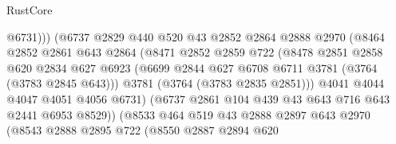 \begin{lexlean}{RustCore}
\begin{coremodule}
                                      @6731)))
                                (@6737
                                  @2829
                                  @440
                                  @520
                                  @43
                                  @2852
                                  @2864
                                  @2888
                                  @2970
                                  (@8464
                                    @2852
                                    @2861
                                    @643
                                    @2864
                                    (@8471
                                      @2852
                                      @2859
                                      @722
                                      (@8478
                                        @2851
                                        @2858
                                        @620
                                        @2834
                                        @627
                                        @6923
                                        (@6699
                                          @2844
                                          @627
                                          @6708
                                          @6711
                                          @3781
                                          (@3764 (@3783 @2845 @643)))
                                        @3781
                                        (@3764 (@3783 @2835 @2851)))
                                      @4041
                                      @4044
                                      @4047
                                      @4051
                                      @4056
                                      @6731)
                                    (@6737 @2861 @104 @439 @43 @643 @716 @643 @2441 @6953 @8529))
                                  (@8533
                                    @464
                                    @519
                                    @43
                                    @2888
                                    @2897
                                    @643
                                    @2970
                                    (@8543
                                      @2888
                                      @2895
                                      @722
                                      (@8550
                                        @2887
                                        @2894
                                        @620

\end{coremodule}
\end{lexlean}
